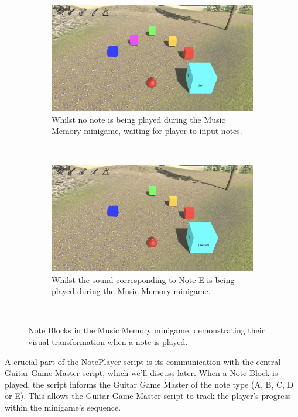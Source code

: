 \documentclass{l4proj}
\begin{document}
\begin{figure}[h]
    \centering
    \begin{subfigure}[b]{0.45\textwidth}
        \includegraphics[width=\textwidth]{dissertation/images/Memory_Game_HarmonyScape.png}
        \caption{Whilst no note is being played during the Music Memory minigame, waiting for player to input notes.}
        \label{fig:mem_game_unplayed}
    \end{subfigure}
    ~ 
    \begin{subfigure}[b]{0.45\textwidth}
        \includegraphics[width=\textwidth]{dissertation/images/Memory_Game_During.png}
        \caption{Whilst the sound corresponding to Note E is being played during the Music Memory minigame.}
        \label{fig:mem_game_played}
    \end{subfigure}
    ~     
    \caption{Note Blocks in the Music Memory minigame, demonstrating their visual transformation when a note is played.
    }
    \label{fig:mem_game} 
\end{figure}

A crucial part of the NotePlayer script is its communication with the central Guitar Game Master script, which we'll discuss later. When a Note Block is played, the script informs the Guitar Game Master of the note type (A, B, C, D or E). This allows the Guitar Game Master script to track the player's progress within the minigame's sequence.
\newline
\end{document}
